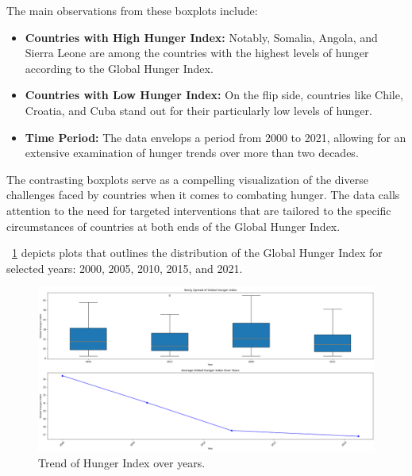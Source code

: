                 The main observations from these boxplots include:

                \begin{itemize}
                        \item \textbf{Countries with High Hunger Index:} Notably, Somalia, Angola, and Sierra Leone are among the countries with the highest levels of hunger according to the Global Hunger Index.

                        \item \textbf{Countries with Low Hunger Index:} On the flip side, countries like Chile, Croatia, and Cuba stand out for their particularly low levels of hunger.

                        \item \textbf{Time Period:} The data envelops a period from 2000 to 2021, allowing for an extensive examination of hunger trends over more than two decades.
                \end{itemize}

                The contrasting boxplots serve as a compelling visualization of the diverse challenges faced by countries when it comes to combating hunger. The data calls attention to the need for targeted interventions that are tailored to the specific circumstances of countries at both ends of the Global Hunger Index.



                \figurename~\ref{fig:du-hunger-trend-years} depicts plots that outlines the distribution of the Global Hunger Index for selected years: 2000, 2005, 2010, 2015, and 2021.


                \begin{figure}[H]
                        \centering
                        \includegraphics[scale=0.3]{images/du_hunger_hu_in_y_trend}
                        \caption{Trend of Hunger Index over years.}
                        \label{fig:du-hunger-trend-years}
                \end{figure}


